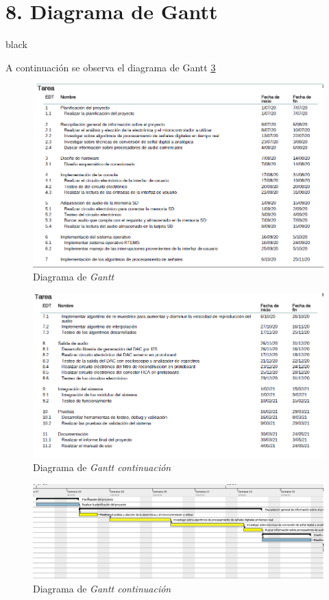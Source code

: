 \documentclass[11pt]{charter}
\begin{document}
\section{8. Diagrama de Gantt}
\label{sec:gantt}
\begin{consigna}{black}

A continuación se observa el diagrama de Gantt \ref{fig:gant1}

\begin{figure}[H]
\centering 
\includegraphics[width=1.1\textwidth]{./Figuras/gant1.png}
\caption{Diagrama de \textit{Gantt}}
\label{fig:gant1}
\end{figure}

\begin{figure}[H]
\centering 
\includegraphics[width=1.1\textwidth]{./Figuras/gant2.png}
\caption{Diagrama de \textit{Gantt continuación}}
\label{fig:gant1}
\end{figure}

\begin{figure}[H]
\centering 
\includegraphics[width=1.5\textwidth,angle=270]{./Figuras/gant3.png}
\caption{Diagrama de \textit{Gantt continuación}}
\label{fig:gant1}
\end{figure}


\end{consigna}
\end{document}
